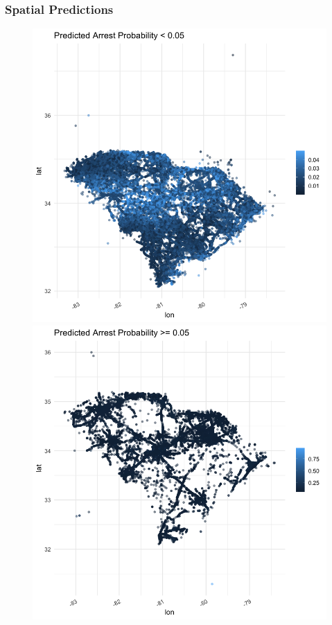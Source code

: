 \documentclass{beamer}
\begin{document}
\begin{frame}
\frametitle{Spatial Predictions}

\begin{figure}
\includegraphics[scale=.2]{figures/spatialPredLow}
\includegraphics[scale=.2]{figures/spatialPredHigh}
\end{figure}

\end{frame}
\end{document}
